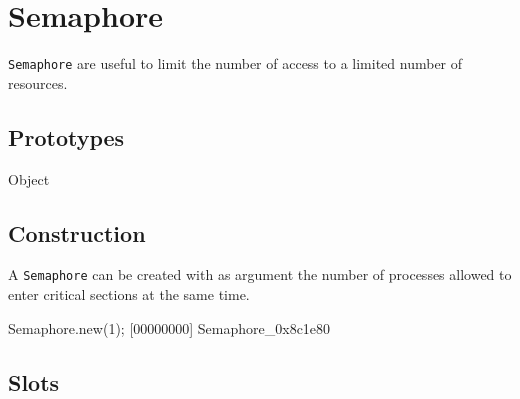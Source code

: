 
\section{Semaphore}

\lstinline|Semaphore| are useful to limit the number of access to a limited
number of resources.

\subsection{Prototypes}

\begin{refObjects}
\item[Object]
\end{refObjects}

\subsection{Construction}

A \lstinline|Semaphore| can be created with as argument the number of
processes allowed to enter critical sections at the same time.

\begin{urbiscript}[firstnumber=1]
Semaphore.new(1);
[00000000] Semaphore_0x8c1e80
\end{urbiscript}

\subsection{Slots}

